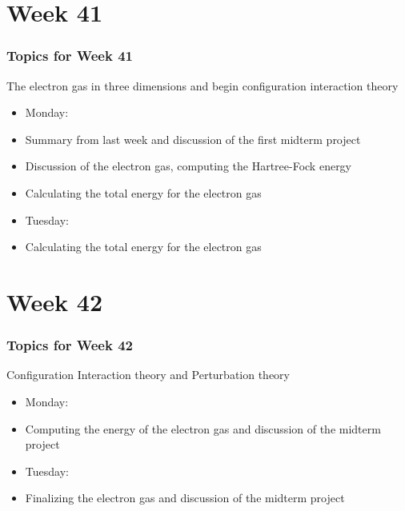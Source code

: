 \documentclass[compress]{beamer}
\begin{document}



\frame[containsverbatim]


\section{Week 41}
\frame
{
  \frametitle{Topics for Week 41}
  \begin{block}{The electron gas in three dimensions and begin configuration interaction theory}
\begin{itemize}
\item Monday:
\item Summary from last week and discussion of the first midterm project
\item Discussion of the electron gas, computing the Hartree-Fock energy 
\item Calculating the total energy for the electron gas
\item Tuesday:
\item Calculating the total energy for the electron gas
\end{itemize}
  \end{block}
} 

\section{Week 42}
\frame
{
  \frametitle{Topics for Week 42}
  \begin{block}{Configuration Interaction theory and Perturbation theory}
\begin{itemize}
\item Monday:
\item Computing the energy of the electron gas and discussion of the midterm project
\item Tuesday:
\item Finalizing the electron gas and discussion of the midterm project
\end{itemize}
  \end{block}
} 
\end{document}
